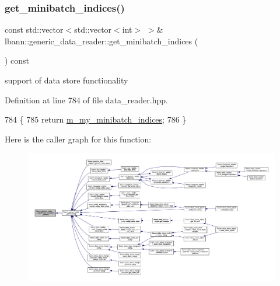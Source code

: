 \subsubsection{\texorpdfstring{get\+\_\+minibatch\+\_\+indices()}{get\_minibatch\_indices()}}
{\footnotesize\ttfamily const std\+::vector$<$std\+::vector$<$int$>$ $>$\& lbann\+::generic\+\_\+data\+\_\+reader\+::get\+\_\+minibatch\+\_\+indices (\begin{DoxyParamCaption}{ }\end{DoxyParamCaption}) const\hspace{0.3cm}{\ttfamily [inline]}}



support of data store functionality 



Definition at line 784 of file data\+\_\+reader.\+hpp.


\begin{DoxyCode}
784                                                                    \{
785     \textcolor{keywordflow}{return} \hyperlink{classlbann_1_1generic__data__reader_a5048d99a58ccddf4fb170c6face8cf4e}{m\_my\_minibatch\_indices};
786   \}
\end{DoxyCode}
Here is the caller graph for this function\+:\nopagebreak
\begin{figure}[H]
\begin{center}
\leavevmode
\includegraphics[width=350pt]{classlbann_1_1generic__data__reader_a192632a8037f6a1eef202747f5916bf3_icgraph}
\end{center}
\end{figure}
\mbox{\label{classlbann_1_1generic__data__reader_a9e78b6062be9746c81eabf0f9d28264e}} 
